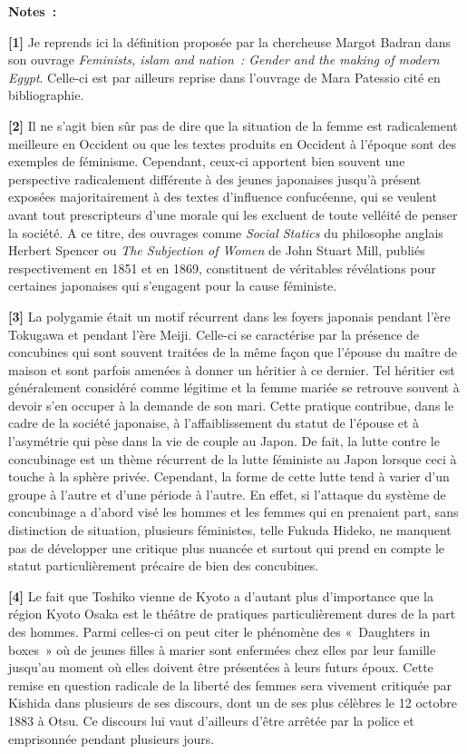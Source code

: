 \documentclass[11pt,a4paper]{article}
\begin{document}
\textbf{Notes~:}

\textbf{{[}1{]}} Je reprends ici la définition proposée par la chercheuse Margot Badran dans son ouvrage \emph{Feminists, islam and nation~: Gender and the making of modern Egypt}. Celle-ci est par ailleurs reprise dans l’ouvrage de Mara Patessio cité en bibliographie.

\textbf{{[}2{]}} Il ne s’agit bien sûr pas de dire que la situation de la femme est radicalement meilleure en Occident ou que les textes produits en Occident à l’époque sont des exemples de féminisme. Cependant, ceux-ci apportent bien souvent une perspective radicalement différente à des jeunes japonaises jusqu’à présent exposées majoritairement à des textes d’influence confucéenne, qui se veulent avant tout prescripteurs d’une morale qui les excluent de toute velléité de penser la société. A ce titre, des ouvrages comme \emph{Social Statics} du philosophe anglais Herbert Spencer ou \emph{The Subjection of Women} de John Stuart Mill, publiés respectivement en 1851 et en 1869, constituent de véritables révélations pour certaines japonaises qui s’engagent pour la cause féministe.

\textbf{{[}3{]}} La polygamie était un motif récurrent dans les foyers japonais pendant l’ère Tokugawa et pendant l’ère Meiji. Celle-ci se caractérise par la présence de concubines qui sont souvent traitées de la même façon que l’épouse du maître de maison et sont parfois amenées à donner un héritier à ce dernier. Tel héritier est généralement considéré comme légitime et la femme mariée se retrouve souvent à devoir s’en occuper à la demande de son mari. Cette pratique contribue, dans le cadre de la société japonaise, à l’affaiblissement du statut de l’épouse et à l’asymétrie qui pèse dans la vie de couple au Japon. De fait, la lutte contre le concubinage est un thème récurrent de la lutte féministe au Japon lorsque ceci à touche à la sphère privée. Cependant, la forme de cette lutte tend à varier d’un groupe à l’autre et d’une période à l’autre. En effet, si l’attaque du système de concubinage a d’abord visé les hommes et les femmes qui en prenaient part, sans distinction de situation, plusieurs féministes, telle Fukuda Hideko, ne manquent pas de développer une critique plus nuancée et surtout qui prend en compte le statut particulièrement précaire de bien des concubines.

\textbf{{[}4{]}} Le fait que Toshiko vienne de Kyoto a d’autant plus d’importance que la région Kyoto Osaka est le théâtre de pratiques particulièrement dures de la part des hommes. Parmi celles-ci on peut citer le phénomène des «~Daughters in boxes~» où de jeunes filles à marier sont enfermées chez elles par leur famille jusqu’au moment où elles doivent être présentées à leurs futurs époux. Cette remise en question radicale de la liberté des femmes sera vivement critiquée par Kishida dans plusieurs de ses discours, dont un de ses plus célèbres le 12 octobre 1883 à Otsu. Ce discours lui vaut d’ailleurs d’être arrêtée par la police et emprisonnée pendant plusieurs jours. 
\end{document}
